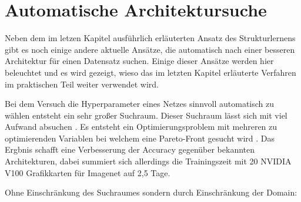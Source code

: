 \section{Automatische Architektursuche}\label{sec:auto}
Neben dem im letzen Kapitel ausführlich erläuterten Ansatz des Strukturlernens gibt es noch einige andere aktuelle Ansätze, die automatisch nach einer besseren Architektur für einen Datensatz suchen. Einige dieser Ansätze werden hier beleuchtet und es wird gezeigt, wieso das im letzten Kapitel erläuterte Verfahren im praktischen Teil weiter verwendet wird.

Bei dem Versuch die Hyperparameter eines Netzes sinnvoll automatisch zu wählen entsteht ein sehr großer Suchraum. Dieser Suchraum lässt sich mit viel Aufwand absuchen \cite{dvolver}. Es entsteht ein Optimierungsproblem mit mehreren zu optimierenden Variablen bei welchem eine Pareto-Front gesucht wird \cite{dvolver}. Das Ergbnis schafft eine Verbesserung der Accuracy gegenüber bekannten Architekturen, dabei summiert sich allerdings die Trainingszeit mit 20 NVIDIA V100 Grafikkarten für Imagenet auf 2,5 Tage\cite{dvolver}.

Ohne Einschränkung des Suchraumes sondern durch Einschränkung der Domain:
 



